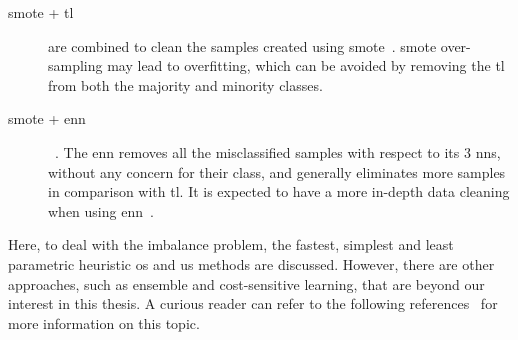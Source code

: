 \begin{description}
  \item[\ac{smote} + \ac{tl}] are combined to clean the samples created using \ac{smote}~\cite{batista2003balancing, prati2009data}.
\Ac{smote} over-sampling may lead to overfitting, which can be avoided by removing the \ac{tl} from both the majority and minority classes.

  \item[\ac{smote} + \ac{enn}] ~\cite{batista2004study}.
The \acl{enn} removes all the misclassified samples with respect to its 3 \ac{nn}s, without any concern for their class, and generally eliminates more samples in comparison with \ac{tl}.
It is expected to have a more in-depth data cleaning when using \ac{enn}~\cite{prati2009data}.
\end{description}

Here, to deal with the imbalance problem, the fastest, simplest and least parametric heuristic \ac{os} and \ac{us} methods are discussed.
However, there are other approaches, such as ensemble and cost-sensitive learning, that are beyond our interest in this thesis.
A curious reader can refer to the following references~\cite{he2009learning,chawla2005data} for more information on this topic.


